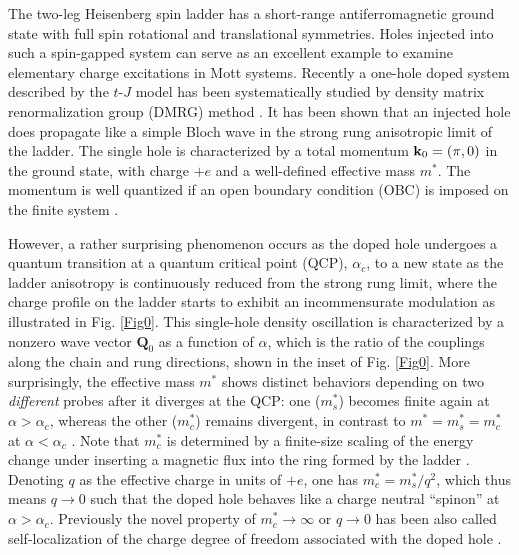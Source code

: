 \documentclass[aps,prb,twocolumn,notitlepage,superscriptaddress,showpacs]{revtex4-1}
\begin{document}
The two-leg Heisenberg spin ladder has a short-range antiferromagnetic ground state with full spin  rotational and translational symmetries\cite{Dagotto1996,White1994,Gopalan1994,Dagotto1994}. Holes injected into such a spin-gapped system can serve as an excellent example to examine elementary charge excitations in Mott systems\cite{Sigrist1994,Troyer1996,White1997,Oitmaa99,Sorella02,Scalapino,Martins2000,Lee1999,Poilblanc2003,Feiguin2008,Jeckelmann1998,Ivanov1998,Brunner2001,Dagotto1992,Tsvelik2011,Balents1996,Jiang2017,Zhu2014,Hayward 1996,Schollwock2003}. Recently  a  one-hole doped system described by the $t$-$J$ model has been systematically studied by density matrix renormalization group (DMRG) method \cite{ZZ2013,ZZ2014qp,ZZ2014cm,WSK2015}.
It has been shown \cite{ZZ2014qp} that an injected hole does propagate like a simple Bloch wave in the strong rung anisotropic limit  of the ladder. The single hole is characterized by a total momentum ${\bf k}_0=(\pi,0)$ in the ground state, with charge $+e$ and a well-defined effective mass $m^*$. The momentum is well quantized if an open boundary condition (OBC) is imposed on the finite system \cite{ZZ2013,ZZ2014qp}.


However, a rather surprising phenomenon occurs \cite{ZZ2014qp} as the doped hole undergoes a quantum transition at a quantum critical point (QCP), $\alpha_c$, to a new state as the ladder anisotropy is continuously reduced from the strong rung limit, where the charge profile on the ladder starts to exhibit an incommensurate modulation \cite{ZZ2014cm} as illustrated in Fig. \ref{Fig0}.  This single-hole density oscillation is characterized by a nonzero wave vector ${\textbf{Q}}_0$ as a function of $\alpha$, which is the ratio of the couplings along the chain and rung directions, shown in the inset of Fig. \ref{Fig0}.  More surprisingly, the effective mass $m^*$ shows distinct behaviors depending on two \emph{different} probes after it diverges at the QCP: one ($m_s^*$) becomes finite again at $\alpha>\alpha_c$, whereas the other ($m_c^*$) remains divergent, in contrast to $m^*=m_s^*=m_c^*$ at $\alpha<\alpha_c$ \cite{ZZ2014qp}. Note that $m_c^*$ is determined by a finite-size scaling of the energy change under inserting a magnetic flux into the ring formed by the ladder \cite{ZZ2013,ZZ2014qp}. Denoting $q$ as the effective charge in units of $+e$, one has $m_c^*=m_s^*/q^2$, which thus means $q\rightarrow 0$ such that the doped hole behaves like a charge neutral ``spinon'' at $\alpha>\alpha_c$. Previously the novel property of $m_c^*\rightarrow \infty$ or $q\rightarrow 0$ has been also called self-localization of the charge degree of freedom associated with the doped hole \cite{ZZ2013,ZZ2014qp,ZZ2014cm}.
\end{document}
